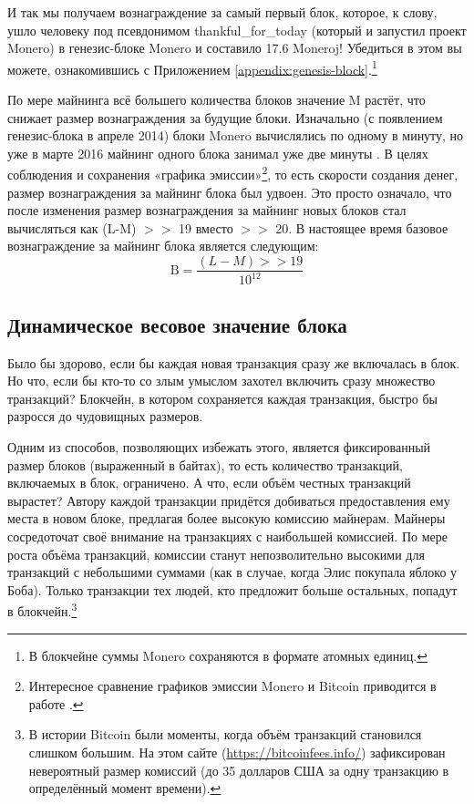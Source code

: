 И так мы получаем вознаграждение за самый первый блок, которое, к слову, ушло человеку под псевдонимом thankful\_for\_today (который и запустил проект Monero) в генезис-блоке Monero \cite{bitmonero-launched} и составило 17.6 Moneroj! Убедиться в этом вы можете, ознакомившись с Приложением \ref{appendix:genesis-block}.\footnote{В блокчейне суммы Monero сохраняются в формате атомных единиц.}

По мере майнинга всё большего количества блоков значение M растёт, что снижает размер вознаграждения за будущие блоки. Изначально (с появлением генезис-блока в апреле 2014) блоки Monero вычислялись по одному в минуту, но уже в марте 2016 майнинг одного блока занимал уже две минуты \cite{monero-0.9.3}. В целях соблюдения и сохранения «графика эмиссии»\footnote{Интересное сравнение графиков эмиссии Monero и Bitcoin приводится в работе \cite{monero-coin-emission}.}, то есть скорости создания денег, размер вознаграждения за майнинг блока был удвоен. Это просто означало, что после изменения размер вознаграждения за майнинг новых блоков стал вычисляться как (L-M) $>>$ 19 вместо $>>$ 20. В настоящее время базовое вознаграждение за майнинг блока является следующим:\vspace{.175cm}
\[\textrm{B} = \frac{(L-M) >> 19}{10^{12}}\]


\subsection{Динамическое весовое значение блока}
\label{subsec:dynamic-block-weight}

Было бы здорово, если бы каждая новая транзакция сразу же включалась в блок. Но что, если бы кто-то со злым умыслом захотел включить сразу множество транзакций? Блокчейн, в котором сохраняется каждая транзакция, быстро бы разросся до чудовищных размеров.

Одним из способов, позволяющих избежать этого, является фиксированный размер блоков (выраженный в байтах), то есть количество транзакций, включаемых в блок, ограничено. А что, если объём честных транзакций вырастет? Автору каждой транзакции придётся добиваться предоставления ему места в новом блоке, предлагая более высокую комиссию майнерам. Майнеры сосредоточат своё внимание на транзакциях с наибольшей комиссией. По мере роста объёма транзакций, комиссии станут непозволительно высокими для транзак\-ций с небольшими суммами (как в случае, когда Элис покупала яблоко у Боба). Только транзакции тех людей, кто предложит больше остальных, попадут в блокчейн.\footnote{В истории Bitcoin были моменты, когда объём транзакций становился слишком большим. На этом сайте (\url{https://bitcoinfees.info/}) зафиксирован невероятный размер комиссий (до 35 долларов США за одну транзакцию в определённый момент времени).}\\

